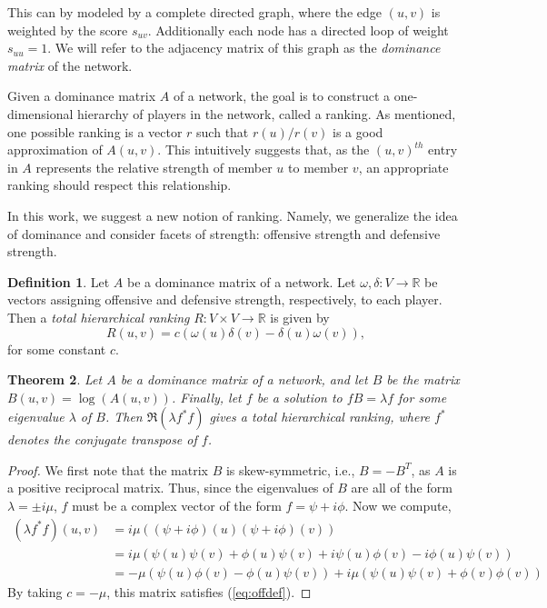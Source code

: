 \documentclass[a4,11pt,twoside,leqno]{report}
\newtheorem{thm}{Theorem}[section]
\theoremstyle{definition}
\newtheorem{defn}[thm]{Definition}
\theoremstyle{remark}
\numberwithin{equation}{section}
\newcommand{\R}{\mathbb{R}}
\begin{document}
This can by modeled by a complete directed graph, where the edge $(u,v)$ is
weighted by the score $s_{uv}$.  Additionally each node has a directed loop of
weight $s_{uu} = 1$.  We will refer to the adjacency matrix of this graph as
the \emph{dominance matrix} of the network.

Given a dominance matrix $A$ of a network, the goal is to construct a
one-dimensional hierarchy of players in the network, called a ranking.  As
mentioned, one possible ranking is a vector $r$ such that $r(u)/r(v)$ is a good
approximation of $A(u,v)$.  This intuitively suggests that, as the $(u,v)^{th}$
entry in $A$ represents the relative strength of member $u$ to member $v$, an
appropriate ranking should respect this relationship.

In this work, we suggest a new notion of ranking.  Namely, we generalize the
idea of dominance and consider facets of strength: offensive strength and
defensive strength.

\begin{defn}
Let $A$ be a dominance matrix of a network.  Let $\omega, \delta: V\rightarrow
\R$ be vectors assigning offensive and defensive strength, respectively, to each
player.  Then a \emph{total hierarchical ranking} $R: V\times V \rightarrow \R$
is given by
\begin{equation}\label{eq:offdef}
R(u,v) = c(\omega(u)\delta(v) - \delta(u)\omega(v)),
\end{equation}
for some constant $c$.
\end{defn}

\begin{thm}\label{thm:thr}
Let $A$ be a dominance matrix of a network, and let $B$ be the matrix $B(u,v) =
\log(A(u,v))$.  Finally, let $f$ be a solution to $fB = \lambda f$ for some
eigenvalue $\lambda$ of $B$.  Then $\Re(\lambda f^*f)$ gives a total
hierarchical ranking, where $f^*$ denotes the conjugate transpose of $f$.
\end{thm}

\begin{proof}
We first note that the matrix $B$ is skew-symmetric, i.e., $B = -B^T$, as $A$ is
a positive reciprocal matrix.  Thus, since the eigenvalues of $B$ are all of the
form $\lambda = \pm i\mu$, $f$ must be a complex vector of the form $f = \psi +
i\phi$.  Now we compute,
\begin{align*}
(\lambda f^* f)(u,v) &= i\mu((\psi+i\phi)(u)(\psi+i\phi)(v))\\
&= i\mu(\psi(u)\psi(v) + \phi(u)\psi(v) + i\psi(u)\phi(v) -i\phi(u)\psi(v))\\
&= -\mu(\psi(u)\phi(v) - \phi(u)\psi(v)) + i\mu(\psi(u)\psi(v) + \phi(v)\phi(v))
\end{align*}
By taking $c = -\mu$, this matrix satisfies (\ref{eq:offdef}).
\end{proof}
\end{document}
